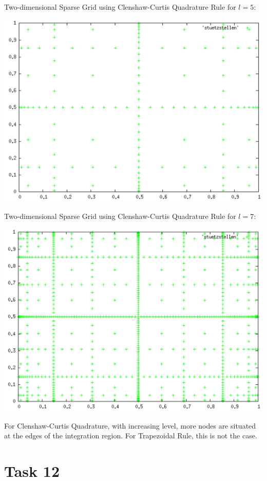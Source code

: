 \documentclass[10pt,a4paper]{article}
\begin{document}
Two-dimensional Sparse Grid using Clenshaw-Curtis Quadrature Rule for $l=5$:
\begin{center}
\includegraphics[scale=0.5]{clenshaw_curtis_l5.png}	
\end{center}
\newpage
Two-dimensional Sparse Grid using Clenshaw-Curtis Quadrature Rule for $l=7$:
\begin{center}
\includegraphics[scale=0.5]{clenshaw_curtis_l7.png}	
\end{center}
For Clenshaw-Curtis Quadrature, with increasing level, more nodes are situated at the edges of the integration region. For Trapezoidal Rule, this is not the case.

\newpage
\section*{Task 12}
\end{document}
